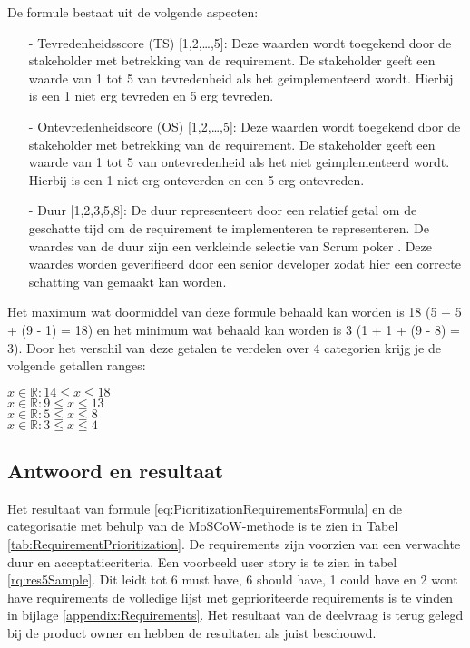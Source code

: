 \whitespace
De formule bestaat uit de volgende aspecten:
\begin{enumerate}
	\item[-] Tevredenheidsscore (TS) [1,2,\ldots,5]: Deze waarden wordt toegekend door de stakeholder met betrekking van de requirement.
	      De stakeholder geeft een waarde van 1 tot 5 van tevredenheid als het geimplementeerd wordt.
	      Hierbij is een 1 niet erg tevreden en 5 erg tevreden.
	\item[-] Ontevredenheidscore (OS) [1,2,\dots,5]: Deze waarden wordt toegekend door de stakeholder met betrekking van de requirement.
	      De stakeholder geeft een waarde van 1 tot 5 van ontevredenheid als het niet geimplementeerd wordt.
	      Hierbij is een 1 niet erg onteverden en een 5 erg ontevreden.
	\item[-] Duur [1,2,3,5,8]: De duur representeert door een relatief getal om de geschatte tijd om de requirement te implementeren te representeren.
	      De waardes van de duur zijn een verkleinde selectie van Scrum poker \Parencite{ScrumPoker}.
	      Deze waardes worden geverifieerd door een senior developer zodat hier een correcte schatting van gemaakt kan worden.
\end{enumerate}

\whitespace
Het maximum wat doormiddel van deze formule behaald kan worden is 18 (5 + 5 + (9 - 1) = 18) en het minimum wat behaald kan worden is 3 (1 + 1 + (9 - 8) = 3).
Door het verschil van deze getalen te verdelen over 4 categorien krijg je de volgende getallen ranges:

\whitespace
{} $ x \in \mathbb{R} : 14 \leq x \leq 18 $ \\
 $ x \in \mathbb{R} : 9 \leq x \leq 13 $ \\
 $ x \in \mathbb{R} :  5 \leq x \leq 8 $ \\
 $ x \in \mathbb{R} : 3 \leq x \leq 4 $

\newpage
\subsection{Antwoord en resultaat}
Het resultaat van formule \ref{eq:PioritizationRequirementsFormula} en de categorisatie met behulp van de MoSCoW-methode is te zien in Tabel \ref{tab:RequirementPrioritization}.
De requirements zijn voorzien van een verwachte duur en acceptatiecriteria.
Een voorbeeld user story is te zien in tabel \ref{rq:res5Sample}.
Dit leidt tot 6 must have, 6 should have, 1 could have en 2 wont have requirements de volledige lijst met geprioriteerde requirements is te vinden in bijlage \ref{appendix:Requirements}.
Het resultaat van de deelvraag is terug gelegd bij de product owner en hebben de resultaten als juist beschouwd.

